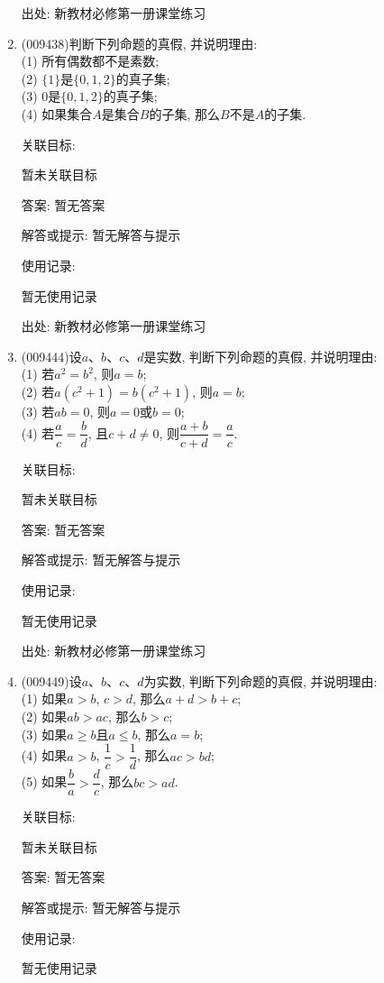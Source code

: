 \documentclass[10pt,a4paper]{article}
\begin{document}
\begin{enumerate}[1.]
出处: 新教材必修第一册课堂练习
\item { (009438)}判断下列命题的真假, 并说明理由:\\
(1) 所有偶数都不是素数;\\
(2) $\{1\}$是$\{0, 1, 2\}$的真子集;\\
(3) $0$是$\{0, 1, 2\}$的真子集;\\
(4) 如果集合$A$是集合$B$的子集, 那么$B$不是$A$的子集.


关联目标:

暂未关联目标

答案: 暂无答案

解答或提示: 暂无解答与提示

使用记录:

暂无使用记录


出处: 新教材必修第一册课堂练习
\item { (009444)}设$a$、$b$、$c$、$d$是实数, 判断下列命题的真假, 并说明理由:\\
(1) 若$a^2=b^2$, 则$a=b$;\\
(2) 若$a(c^2+1)=b(c^2+1)$, 则$a=b$;\\
(3) 若$ab=0$, 则$a=0$或$b=0$;\\
(4) 若$\dfrac ac=\dfrac bd$, 且$c+d\ne 0$, 则$\dfrac{a+b}{c+d}=\dfrac ac$.


关联目标:

暂未关联目标

答案: 暂无答案

解答或提示: 暂无解答与提示

使用记录:

暂无使用记录


出处: 新教材必修第一册课堂练习
\item { (009449)}设$a$、$b$、$c$、$d$为实数, 判断下列命题的真假, 并说明理由:\\
(1) 如果$a>b$, $c>d$, 那么$a+d>b+c$;\\
(2) 如果$ab>ac$, 那么$b>c$;\\
(3) 如果$a\ge b$且$a\le b$, 那么$a=b$;\\
(4) 如果$a>b$, $\dfrac 1c>\dfrac 1d$, 那么$ac>bd$;\\
(5) 如果$\dfrac ba>\dfrac dc$, 那么$bc>ad$.


关联目标:

暂未关联目标

答案: 暂无答案

解答或提示: 暂无解答与提示

使用记录:

暂无使用记录



\end{enumerate}
\end{document}
